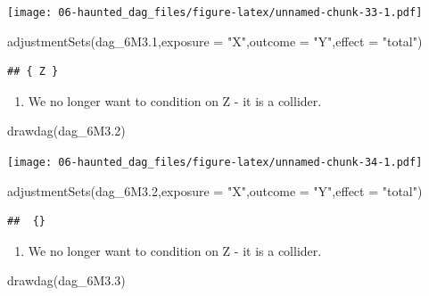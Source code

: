 \documentclass[
]{book}
\newenvironment{Shaded}{\begin{snugshade}}{\end{snugshade}}
\newcommand{\AttributeTok}[1]{\textcolor[rgb]{0.77,0.63,0.00}{#1}}
\newcommand{\FloatTok}[1]{\textcolor[rgb]{0.00,0.00,0.81}{#1}}
\newcommand{\FunctionTok}[1]{\textcolor[rgb]{0.00,0.00,0.00}{#1}}
\newcommand{\NormalTok}[1]{#1}
\newcommand{\StringTok}[1]{\textcolor[rgb]{0.31,0.60,0.02}{#1}}
\providecommand{\tightlist}{%
  \setlength{\itemsep}{0pt}\setlength{\parskip}{0pt}}
\begin{document}
\texttt{[image: 06-haunted\_dag\_files/figure-latex/unnamed-chunk-33-1.pdf]}

\begin{Shaded}
\begin{Highlighting}[]
\FunctionTok{adjustmentSets}\NormalTok{(dag\_6M3}\FloatTok{.1}\NormalTok{,}\AttributeTok{exposure =} \StringTok{"X"}\NormalTok{,}\AttributeTok{outcome =} \StringTok{"Y"}\NormalTok{,}\AttributeTok{effect =} \StringTok{"total"}\NormalTok{)}
\end{Highlighting}
\end{Shaded}

\begin{verbatim}
## { Z }
\end{verbatim}

\begin{enumerate}
\def\labelenumi{\arabic{enumi}.}
\setcounter{enumi}{1}
\tightlist
\item
  We no longer want to condition on Z - it is a collider.
\end{enumerate}

\begin{Shaded}
\begin{Highlighting}[]
\FunctionTok{drawdag}\NormalTok{(dag\_6M3}\FloatTok{.2}\NormalTok{)}
\end{Highlighting}
\end{Shaded}

\texttt{[image: 06-haunted\_dag\_files/figure-latex/unnamed-chunk-34-1.pdf]}

\begin{Shaded}
\begin{Highlighting}[]
\FunctionTok{adjustmentSets}\NormalTok{(dag\_6M3}\FloatTok{.2}\NormalTok{,}\AttributeTok{exposure =} \StringTok{"X"}\NormalTok{,}\AttributeTok{outcome =} \StringTok{"Y"}\NormalTok{,}\AttributeTok{effect =} \StringTok{"total"}\NormalTok{)}
\end{Highlighting}
\end{Shaded}

\begin{verbatim}
##  {}
\end{verbatim}

\begin{enumerate}
\def\labelenumi{\arabic{enumi}.}
\setcounter{enumi}{2}
\tightlist
\item
  We no longer want to condition on Z - it is a collider.
\end{enumerate}

\begin{Shaded}
\begin{Highlighting}[]
\FunctionTok{drawdag}\NormalTok{(dag\_6M3}\FloatTok{.3}\NormalTok{)}
\end{Highlighting}
\end{Shaded}
\end{document}
